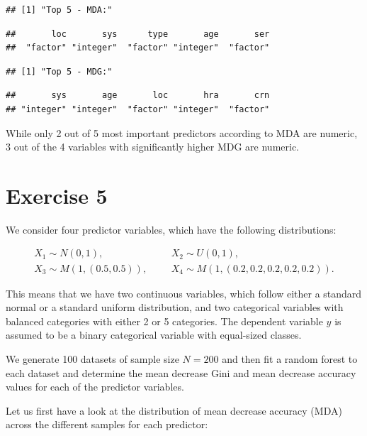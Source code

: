 \documentclass[
]{article}
\begin{document}
\begin{verbatim}
## [1] "Top 5 - MDA:"
\end{verbatim}

\begin{verbatim}
##       loc       sys      type       age       ser 
##  "factor" "integer"  "factor" "integer"  "factor"
\end{verbatim}

\begin{verbatim}
## [1] "Top 5 - MDG:"
\end{verbatim}

\begin{verbatim}
##       sys       age       loc       hra       crn 
## "integer" "integer"  "factor" "integer"  "factor"
\end{verbatim}

While only 2 out of 5 most important predictors according to MDA are
numeric, 3 out of the 4 variables with significantly higher MDG are
numeric.

\section{Exercise 5}\label{exercise-5}

We consider four predictor variables, which have the following
distributions:

\begin{align}
X_1 \sim N(0, 1),&& &X_2 \sim U(0, 1), \\
X_3 \sim M(1, (0.5, 0.5)),&& &X_4 \sim M(1, (0.2, 0.2, 0.2, 0.2, 0.2)).
\end{align}

This means that we have two continuous variables, which follow either a
standard normal or a standard uniform distribution, and two categorical
variables with balanced categories with either 2 or 5 categories. The
dependent variable \(y\) is assumed to be a binary categorical variable
with equal-sized classes.

We generate 100 datasets of sample size \(N = 200\) and then fit a
random forest to each dataset and determine the mean decrease Gini and
mean decrease accuracy values for each of the predictor variables.

Let us first have a look at the distribution of mean decrease accuracy
(MDA) across the different samples for each predictor:
\end{document}
